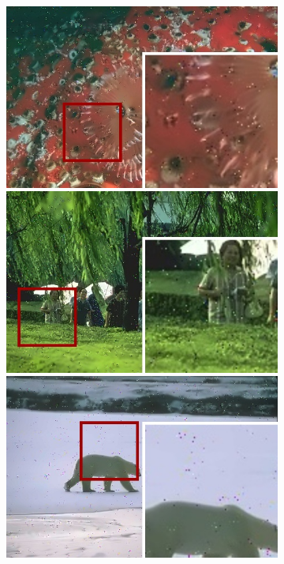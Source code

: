 \begin{figure}[!ht]
\begin{subfigure}[]{0.22\textwidth}
    \includegraphics[width=\textwidth]{./figures/sensor/berkeley/12084_nonlocalmeans_frame.jpg}\vspace{0.1cm}\\
    \includegraphics[width=\textwidth]{./figures/sensor/berkeley/65033_nonlocalmeans_frame.jpg}\vspace{0.1cm}\\
    \includegraphics[width=\textwidth]{./figures/sensor/berkeley/100007_nonlocalmeans_frame.jpg}%

\end{subfigure}
\end{figure}

